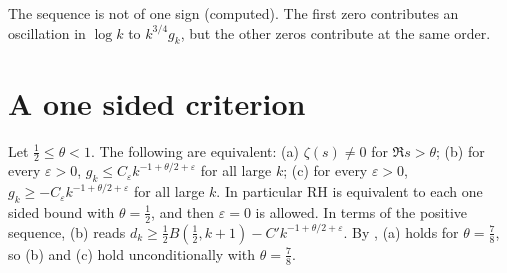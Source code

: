 The sequence is not of one sign (computed). The first zero contributes an oscillation in $\log k$ to $k^{3/4}g_k$, but the other zeros contribute at the same order.

\section{A one sided criterion}\label{mh:sec:criterion}

\begin{theorem}\label{mh:thm:landau}
Let $\tfrac12\le\theta<1$. The following are equivalent: (a) $\zeta(s)\ne0$ for $\Re s>\theta$; (b) for every $\varepsilon>0$, $g_k\le C_\varepsilon k^{-1+\theta/2+\varepsilon}$ for all large $k$; (c) for every $\varepsilon>0$, $g_k\ge-C_\varepsilon k^{-1+\theta/2+\varepsilon}$ for all large $k$. In particular RH is equivalent to each one sided bound with $\theta=\tfrac12$, and then $\varepsilon=0$ is allowed. In terms of the positive sequence, (b) reads $d_k\ge\tfrac12B(\tfrac12,k+1)-C'k^{-1+\theta/2+\varepsilon}$. By \cite{OAI26a}, (a) holds for $\theta=\frac78$, so (b) and (c) hold unconditionally with $\theta=\frac78$.
\end{theorem}

